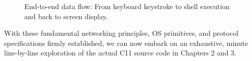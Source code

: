 \begin{figure}[htbp]
\caption{End-to-end data flow: From keyboard keystroke to shell execution and back to screen display.}
\label{fig:end_to_end_flow}
\end{figure}

With these fundamental networking principles, OS primitives, and protocol specifications firmly established, we can now embark on an exhaustive, minute line-by-line exploration of the actual C11 source code in Chapters 2 and 3.

